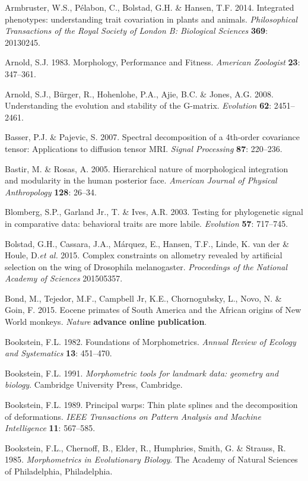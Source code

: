 \documentclass[12pt,twoside]{report}
\begin{document}
Armbruster, W.S., Pélabon, C., Bolstad, G.H. \& Hansen, T.F. 2014.
Integrated phenotypes: understanding trait covariation in plants and
animals. \emph{Philosophical Transactions of the Royal Society of London
B: Biological Sciences} \textbf{369}: 20130245.

Arnold, S.J. 1983. Morphology, Performance and Fitness. \emph{American
Zoologist} \textbf{23}: 347--361.

Arnold, S.J., Bürger, R., Hohenlohe, P.A., Ajie, B.C. \& Jones, A.G.
2008. Understanding the evolution and stability of the G-matrix.
\emph{Evolution} \textbf{62}: 2451--2461.

Basser, P.J. \& Pajevic, S. 2007. Spectral decomposition of a 4th-order
covariance tensor: Applications to diffusion tensor MRI. \emph{Signal
Processing} \textbf{87}: 220--236.

Bastir, M. \& Rosas, A. 2005. Hierarchical nature of morphological
integration and modularity in the human posterior face. \emph{American
Journal of Physical Anthropology} \textbf{128}: 26--34.

Blomberg, S.P., Garland Jr., T. \& Ives, A.R. 2003. Testing for
phylogenetic signal in comparative data: behavioral traits are more
labile. \emph{Evolution} \textbf{57}: 717--745.

Bolstad, G.H., Cassara, J.A., Márquez, E., Hansen, T.F., Linde, K. van
der \& Houle, D.\emph{et al.} 2015. Complex constraints on allometry
revealed by artificial selection on the wing of Drosophila melanogaster.
\emph{Proceedings of the National Academy of Sciences} 201505357.

Bond, M., Tejedor, M.F., Campbell Jr, K.E., Chornogubsky, L., Novo, N.
\& Goin, F. 2015. Eocene primates of South America and the African
origins of New World monkeys. \emph{Nature} \textbf{advance online
publication}.

Bookstein, F.L. 1982. Foundations of Morphometrics. \emph{Annual Review
of Ecology and Systematics} \textbf{13}: 451--470.

Bookstein, F.L. 1991. \emph{Morphometric tools for landmark data:
geometry and biology}. Cambridge University Press, Cambridge.

Bookstein, F.L. 1989. Principal warps: Thin plate splines and the
decomposition of deformations. \emph{IEEE Transactions on Pattern
Analysis and Machine Intelligence} \textbf{11}: 567--585.

Bookstein, F.L., Chernoff, B., Elder, R., Humphries, Smith, G. \&
Strauss, R. 1985. \emph{Morphometrics in Evolutionary Biology}. The
Academy of Natural Sciences of Philadelphia, Philadelphia.
\end{document}
